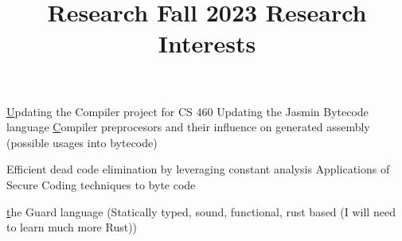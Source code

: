 \documentclass{article}
\begin{document}
\title{Research Fall 2023 Research Interests}


\begin{itemize}
\underline Updating the Compiler project for CS 460
Updating the Jasmin Bytecode language
\underline Compiler preprocesors and their influence on generated assembly (possible usages into bytecode)

Efficient dead code elimination by leveraging constant analysis
Applications of Secure Coding techniques to byte code

\underline the Guard language (Statically typed, sound, functional, rust based (I will need to learn much more Rust))



\end{itemize}
\end{document}
